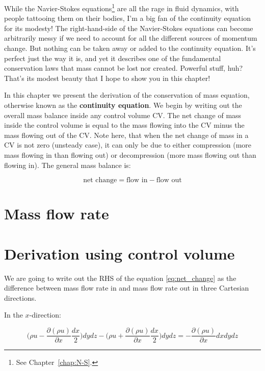 While the Navier-Stokes equations\footnote{See Chapter~\ref{chap:N-S}.} are all the rage in fluid dynamics, with people tattooing them on their bodies, I'm a big fan of the continuity equation for its modesty! The right-hand-side of the Navier-Stokes equations can become arbitrarily messy if we need to account for all the different sources of momentum change. But nothing can be taken away or added to the continuity equation. It's perfect just the way it is, and yet it describes one of the fundamental conservation laws that mass cannot be lost nor created. Powerful stuff, huh? That's its modest beauty that I hope to show you in this chapter!


In this chapter we present the derivation of the conservation of mass equation, otherwise known as the \textbf{continuity equation}. We begin by writing out the overall mass balance inside any control volume CV. The net change of mass inside the control volume is equal to the mass flowing into the CV minus the mass flowing out of the CV. Note here, that when the net change of mass in a CV is not zero (unsteady case), it can only be due to either compression (more mass flowing in than flowing out) or decompression (more mass flowing out than flowing in). The general mass balance is:

\begin{equation} \label{eq:net_change}
\text{net change} = \text{flow in} - \text{flow out}
\end{equation}

\section{Mass flow rate}

\section{Derivation using control volume}

We are going to write out the RHS of the equation \ref{eq:net_change} as the difference between mass flow rate in and mass flow rate out in three Cartesian directions.

In the $x$-direction:

\begin{equation}
\Big( \rho u - \frac{\partial (\rho u)}{\partial x} \frac{dx}{2} \Big) dy dz - \Big( \rho u + \frac{\partial (\rho u)}{\partial x} \frac{dx}{2} \Big) dy dz = - \frac{\partial (\rho u)}{\partial x} dx dy dz
\end{equation}

